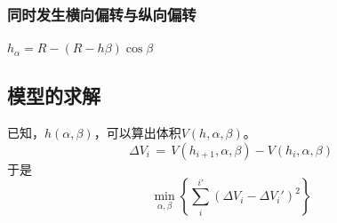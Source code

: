 \subsubsection*{同时发生横向偏转与纵向偏转}
$h_\alpha=R-(R-h\beta)\cos\beta$
\subsection{模型的求解}
已知，$h(\alpha,\beta)$，可以算出体积$V(h,\alpha,\beta)$。
$$\Delta V_i\,=\,V(h_{i+1},\alpha,\beta)-V(h_i,\alpha,\beta)$$
于是
$$\min_{\alpha,\beta}\left\{\sum_i^{i'}(\Delta V_i-\Delta V_i')^2\right\}$$